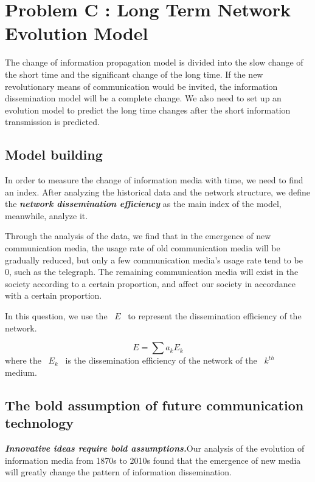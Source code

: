 \documentclass[a4paper,11pt]{article}
\begin{document}
\section{Problem C : Long Term Network Evolution Model}
\par The change of information propagation model is divided into the slow change of the short time and the significant change of the long time. If the new revolutionary means of communication would be invited, the information dissemination model will be a complete change. We also need to set up an evolution model to predict the long time changes after the short information transmission is predicted.

\subsection{Model building}
\par In order to measure the change of information media with time, we need to find an index. After analyzing the historical data and the network structure, we define the \textbf{\emph{network dissemination efficiency}} as the main index of the model, meanwhile, analyze it.
\par Through the analysis of the data, we find that in the emergence of new communication media, the usage rate of old communication media will be gradually reduced, but only a few communication media's usage rate tend to be 0, such as the telegraph. The remaining communication media will exist in the society according to a certain proportion, and affect our society in accordance with a certain proportion.
\par In this question, we use the ~$E$~ to represent the dissemination efficiency of the network. 

\begin{equation}
E=\sum a_kE_k 
\end{equation}
where the ~$E_k$~ is the dissemination efficiency of the network of the ~$k^{th}$~ medium.

\subsection{The bold assumption of future communication technology}
\par \textbf{\emph{Innovative ideas require bold assumptions.}}Our analysis of the evolution of information media from 1870s to 2010s found that the emergence of new media will greatly change the pattern of information dissemination. 
\end{document}
